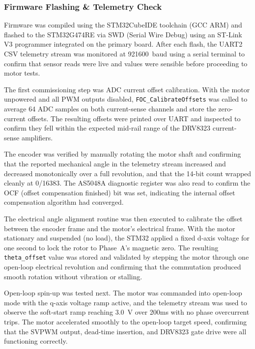 \documentclass[11pt]{article}
\begin{document}
\subsubsection{Firmware Flashing \& Telemetry Check}
\label{sec:fw_commissioning}

Firmware was compiled using the STM32CubeIDE toolchain (GCC ARM) and flashed to the STM32G474RE via SWD (Serial Wire Debug) using an ST-Link V3 programmer integrated on the primary board. After each flash, the UART2 CSV telemetry stream was monitored at 921600~baud using a serial terminal to confirm that sensor reads were live and values were sensible before proceeding to motor tests.

The first commissioning step was ADC current offset calibration. With the motor unpowered and all PWM outputs disabled, \texttt{FOC\_CalibrateOffsets} was called to average 64 ADC samples on both current-sense channels and store the zero-current offsets. The resulting offsets were printed over UART and inspected to confirm they fell within the expected mid-rail range of the DRV8323 current-sense amplifiers.

The encoder was verified by manually rotating the motor shaft and confirming that the reported mechanical angle in the telemetry stream increased and decreased monotonically over a full revolution, and that the 14-bit count wrapped cleanly at 0/16383. The AS5048A diagnostic register was also read to confirm the OCF (offset compensation finished) bit was set, indicating the internal offset compensation algorithm had converged.

The electrical angle alignment routine was then executed to calibrate the offset between the encoder frame and the motor's electrical frame. With the motor stationary and suspended (no load), the STM32 applied a fixed d-axis voltage for one second to lock the rotor to Phase~A's magnetic zero. The resulting \texttt{theta\_offset} value was stored and validated by stepping the motor through one open-loop electrical revolution and confirming that the commutation produced smooth rotation without vibration or stalling.

Open-loop spin-up was tested next. The motor was commanded into open-loop mode with the q-axis voltage ramp active, and the telemetry stream was used to observe the soft-start ramp reaching 3.0~V over 200ms with no phase overcurrent trips. The motor accelerated smoothly to the open-loop target speed, confirming that the SVPWM output, dead-time insertion, and DRV8323 gate drive were all functioning correctly.
\end{document}
